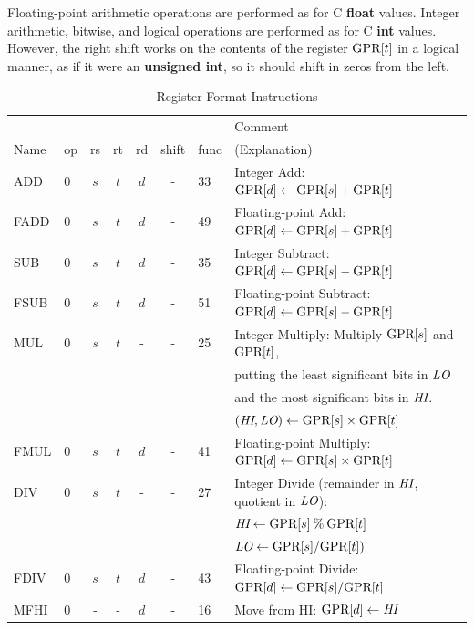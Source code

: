 \documentclass[11pt,letterpaper]{article}
\begin{document}
Floating-point arithmetic operations are performed as for C
\textbf{float} values.
Integer arithmetic, bitwise, and logical operations are performed as for C
\textbf{int} values.
However, the right shift works on the contents of the register
$\textrm{GPR[}t\textrm{]}$ in a logical manner, as if it were an \textbf{unsigned int},
so it should shift in zeros from the left.

\begin{table}[htbp]
\caption{Register Format Instructions}
\label{tab:rformatinstrs}
\begin{tabular}{|l|l|c|c|c|c|l|p{9cm}|}
\hline
~       & ~  & ~  & ~  & ~  & ~     &      & Comment \\
Name    & op & rs & rt & rd & shift & func & (Explanation) \\
\hline
ADD     & 0  &$s$ &$t$ &$d$  & -    & 33 & Integer Add: $\textrm{GPR[}d\textrm{]} \leftarrow \textrm{GPR[}s\textrm{]} + \textrm{GPR[}t\textrm{]}$ \\
\hline
FADD     & 0  &$s$ &$t$ &$d$  & -   & 49 & Floating-point Add: $\textrm{GPR[}d\textrm{]} \leftarrow \textrm{GPR[}s\textrm{]} + \textrm{GPR[}t\textrm{]}$ \\
\hline
SUB     & 0  &$s$ &$t$ &$d$  & -    & 35 & Integer Subtract: $\textrm{GPR[}d\textrm{]} \leftarrow \textrm{GPR[}s\textrm{]} - \textrm{GPR[}t\textrm{]}$ \\
\hline
FSUB     & 0  &$s$ &$t$ &$d$ & -    & 51 & Floating-point Subtract: $\textrm{GPR[}d\textrm{]} \leftarrow \textrm{GPR[}s\textrm{]} - \textrm{GPR[}t\textrm{]}$ \\
\hline
MUL     & 0  &$s$ &$t$ & -    & -  & 25 & Integer Multiply: Multiply
$\textrm{GPR[}s\textrm{]}$ and $\textrm{GPR[}t\textrm{]}$, \\
& & & & & & & putting the least significant bits in $\textit{LO}$ \\
& & & & & & & and the most significant bits in $\textit{HI}$. \\
& & & & & & & $(\textit{HI},\textit{LO}) \leftarrow \textrm{GPR[}s\textrm{]} \times \textrm{GPR[}t\textrm{]}$ \\
\hline
FMUL     & 0  &$s$ &$t$ &$d$ & -    & 41 & Floating-point Multiply: $\textrm{GPR[}d\textrm{]} \leftarrow \textrm{GPR[}s\textrm{]} \times \textrm{GPR[}t\textrm{]}$ \\
\hline
DIV     & 0  &$s$ &$t$ & -   & -    & 27 & Integer Divide (remainder in $\textit{HI}$, quotient in $\textit{LO}$): \\
        &    &    &    &     &      &    & $\textit{HI} \leftarrow \textrm{GPR[}s\textrm{]} \:\hbox{\%}\: \textrm{GPR[}t\textrm{]}$ \\
        &    &    &    &     &      &    & $\textit{LO} \leftarrow \textrm{GPR[}s\textrm{]} / \textrm{GPR[}t\textrm{]})$ \\
\hline
FDIV     & 0  &$s$ &$t$ &$d$ & -    & 43 & Floating-point Divide: $\textrm{GPR[}d\textrm{]} \leftarrow \textrm{GPR[}s\textrm{]} / \textrm{GPR[}t\textrm{]}$ \\
\hline
MFHI    & 0  & -  & -  & $d$ & -    & 16 & Move from HI: $\textrm{GPR[}d\textrm{]} \leftarrow \textit{HI}$ \\

\end{tabular}
\end{table}
\end{document}
